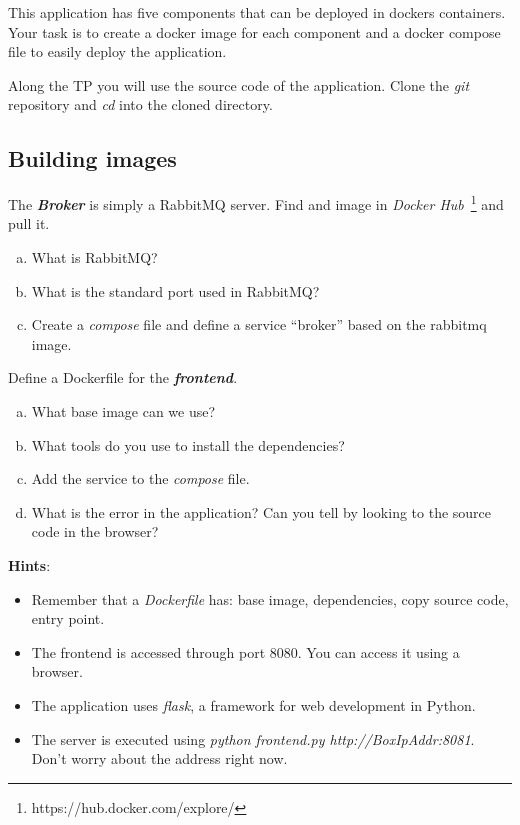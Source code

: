 \documentclass[a4paper,11pt]{exam}
\begin{document}
This application has five components that can be deployed in dockers containers.
Your task is to create a docker image for each component and a docker compose file to easily deploy the application.

Along the TP you will use the source code of the application. Clone the \textit{git} repository and \textit{cd} into the cloned directory. 


\subsection{Building images}

\begin{questions}
	\question The \textit{\textbf{Broker}} is simply a RabbitMQ server. Find and image in \textit{Docker Hub}~\footnote{https://hub.docker.com/explore/} and pull it.
	\begin{enumerate}[(a)] %
		\item What is RabbitMQ?
		\item What is the standard port used in RabbitMQ?
		\item Create a \textit{compose} file and define a service ``broker'' based on the rabbitmq image.
	\end{enumerate}	
	
	\question Define a Dockerfile for the \textit{\textbf{frontend}}.
	\begin{enumerate}[(a)] %
		\item What base image can we use?
		\item What tools do you use to install the dependencies?
		\item Add the service to the \textit{compose} file.
		\item What is the error in the application? Can you tell by looking to the source code in the browser?
	\end{enumerate}
	
	\textbf{Hints}:
	\begin{itemize}
		\item Remember that a \textit{Dockerfile} has: base image, dependencies, copy source code, entry point.
		\item The frontend is accessed through port 8080. You can access it using a browser.
		\item The application uses \textit{flask}, a framework for web development in Python.
		\item The server is executed using \textit{python frontend.py http://BoxIpAddr:8081}. Don't worry about the address right now.
	\end{itemize}
	

\end{questions}
\end{document}
